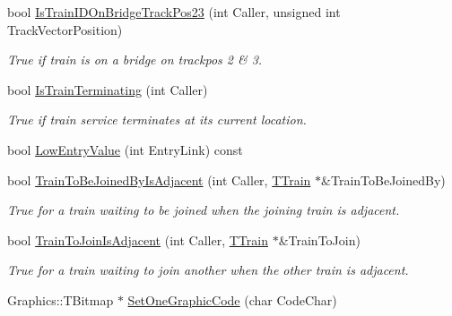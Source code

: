 \begin{DoxyCompactItemize}
bool \mbox{\hyperlink{class_t_train_a6cbff3229246b7a156cd64a531aa60a6}{Is\+Train\+I\+D\+On\+Bridge\+Track\+Pos23}} (int Caller, unsigned int Track\+Vector\+Position)
\begin{DoxyCompactList}\small\item\em True if train is on a bridge on trackpos 2 \& 3. \end{DoxyCompactList}\item 
\mbox{\label{class_t_train_a89e17b8d82633276576e365c980e718a}} 
bool \mbox{\hyperlink{class_t_train_a89e17b8d82633276576e365c980e718a}{Is\+Train\+Terminating}} (int Caller)
\begin{DoxyCompactList}\small\item\em True if train service terminates at its current location. \end{DoxyCompactList}\item 
bool \mbox{\hyperlink{class_t_train_ac2f3802b0d193d220ec6d19e2a6fc7ed}{Low\+Entry\+Value}} (int Entry\+Link) const
\item 
\mbox{\label{class_t_train_ab4fefd748946d8530bca23a7699d0abc}} 
bool \mbox{\hyperlink{class_t_train_ab4fefd748946d8530bca23a7699d0abc}{Train\+To\+Be\+Joined\+By\+Is\+Adjacent}} (int Caller, \mbox{\hyperlink{class_t_train}{T\+Train}} $\ast$\&Train\+To\+Be\+Joined\+By)
\begin{DoxyCompactList}\small\item\em True for a train waiting to be joined when the joining train is adjacent. \end{DoxyCompactList}\item 
\mbox{\label{class_t_train_a23b7b40bba00cae3550bb1a30670c249}} 
bool \mbox{\hyperlink{class_t_train_a23b7b40bba00cae3550bb1a30670c249}{Train\+To\+Join\+Is\+Adjacent}} (int Caller, \mbox{\hyperlink{class_t_train}{T\+Train}} $\ast$\&Train\+To\+Join)
\begin{DoxyCompactList}\small\item\em True for a train waiting to join another when the other train is adjacent. \end{DoxyCompactList}\item 
\mbox{\label{class_t_train_ad7831e71f0c68933df4aea6661a77be5}} 
Graphics\+::\+T\+Bitmap $\ast$ \mbox{\hyperlink{class_t_train_ad7831e71f0c68933df4aea6661a77be5}{Set\+One\+Graphic\+Code}} (char Code\+Char)

\end{DoxyCompactItemize}
